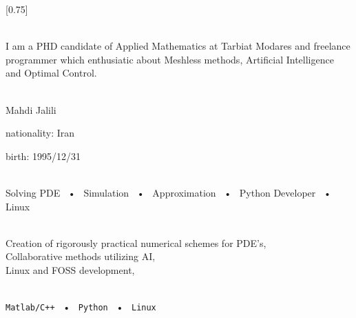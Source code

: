 \documentclass[lighthipster]{Mine}
\begin{document}
\setlength{\columnsep}{1.5cm}
[0.75]
\begin{paracol}{2}

	\paracolbackgroundoptions



	\footnotesize
	{\setasidefontcolour
	\flushright
	\begin{center}
	\end{center}

	\\[0.5em]

	{\footnotesize
	I am a PHD candidate of Applied Mathematics at Tarbiat Modares and freelance programmer which enthusiatic about Meshless methods, Artificial Intelligence and Optimal Control.}
	\bigskip

	 \\[0.5em]
	Mahdi Jalili

	nationality: Iran

	birth: 1995/12/31

	\bigskip

	 \\[0.5em]

	Solving PDE ~•~ Simulation ~•~ Approximation ~•~ Python Developer ~•~ Linux

	\bigskip



	\bigskip

	\\[0.5em]

	Creation of rigorously practical numerical schemes for PDE's,\\
	Collaborative methods utilizing AI, \\
	Linux and FOSS development,
	\bigskip

	\\[0.5em]

	 \texttt{Matlab/C++} ~•~ \texttt{Python} ~•~ \texttt{Linux}


	\vspace{4em}


}
\end{paracol}
\end{document}
